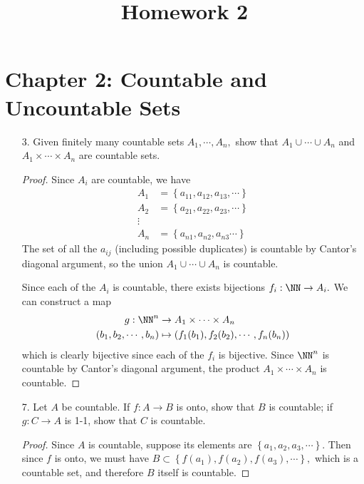 \documentclass{article}
\begin{document}
\title{Homework 2}
\maketitle
\thispagestyle{fancy}

\section*{Chapter 2: Countable and Uncountable Sets}

\begin{itemize}
	\item[3.] Given finitely many countable sets $A_1, \cdots, A_n,$ show that $A_1\cup\cdots\cup A_n$ and $A_1\times\cdots\times A_n$ are countable sets.
		\begin{proof}
			Since $A_i$ are countable, we have
			\begin{align*}
				A_1 &= \left\{ a_{11}, a_{12}, a_{13}, \cdots \right\} \\
				A_2 &= \left\{ a_{21}, a_{22}, a_{23}, \cdots \right\} \\
				\vdots \\
				A_n &= \left\{ a_{n1}, a_{n2}, a_{n3}\cdots \right\}
			\end{align*}
			The set of all the $a_{ij}$ (including possible duplicates) is countable by Cantor's diagonal argument, so the union $A_1\cup\cdots\cup A_n$ is countable.

			Since each of the $A_i$ is countable, there exists bijections $f_i:\NN\to A_i.$ We can construct a map 
			\begin{align*}
				g:\NN^n &\to A_1\times\cdots\times A_n \\
				(b_1, b_2, \cdots, b_n) &\mapsto (f_1(b_1), f_2(b_2), \cdots, f_n(b_n))
			\end{align*}
			which is clearly bijective since each of the $f_i$ is bijective. Since $\NN^n$ is countable by Cantor's diagonal argument, the product $A_1\times\cdots\times A_n$ is countable.
		\end{proof}

	\item[7.] Let $A$ be countable. If $f:A\to B$ is onto, show that $B$ is countable; if $g:C\to A$ is 1-1, show that $C$ is countable.
		\begin{proof}
			Since $A$ is countable, suppose its elements are $\left\{ a_1, a_2, a_3, \cdots \right\}.$ Then since $f$ is onto, we must have $B\subset \left\{ f(a_1), f(a_2), f(a_3), \cdots \right\},$ which is a countable set, and therefore $B$ itself is countable.


\end{proof}
\end{itemize}
\end{document}
